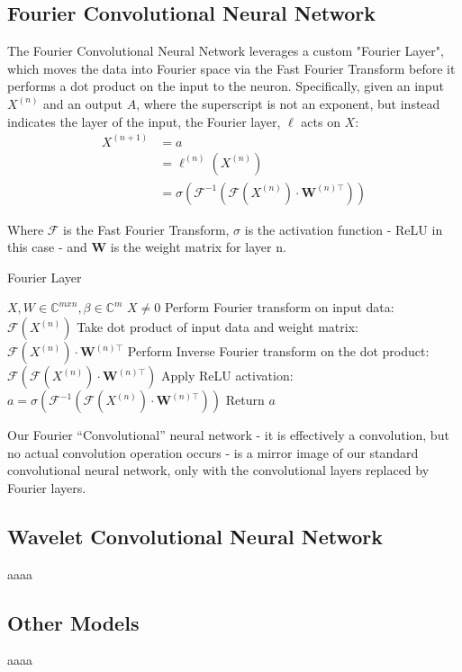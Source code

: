 \documentclass[10pt]{article}
\begin{document}
\subsection{Fourier Convolutional Neural Network}
The Fourier Convolutional Neural Network leverages a custom "Fourier Layer", which moves the data into Fourier space via the Fast Fourier Transform before it performs a dot product on the input to the neuron.
Specifically, given an input $X^{(n)}$ and an output $A$, where the superscript is not an exponent, but instead indicates the layer of the input, the Fourier layer, $\ell$ acts on $X$: 
\begin{align*}
X^{(n+1)} & = a \\
& = \ell^{(n)}(X^{(n)}) \\
& = \sigma(\mathcal{F}^{-1}(\mathcal{F}(X^{(n)})\cdot \mathbf{W}^{(n)\top}))
\end{align*}

Where $\mathcal{F}$ is the Fast Fourier Transform, $\sigma$ is the activation function - ReLU in this case - and $\mathbf{W}$ is the weight matrix for layer n.

\begin{algorithm}
\caption{Fourier Layer}
\label{Fourier layer}
\begin{algorithmic}[1]
\REQUIRE $X, W \in \mathbb{C}^{mxn}, \beta \in \mathbb{C}^m$
\ENSURE $X \neq 0$
\STATE Perform Fourier transform on input data: $\mathcal{F}(X^{(n)})$
\STATE Take dot product of input data and weight matrix: $\mathcal{F}(X^{(n)})\cdot \mathbf{W}^{(n)\top}$
\STATE Perform Inverse Fourier transform on the dot product: $\mathcal{F}(\mathcal{F}(X^{(n)})\cdot \mathbf{W}^{(n)\top})$
\STATE Apply ReLU activation: $a = \sigma(\mathcal{F}^{-1}(\mathcal{F}(X^{(n)})\cdot \mathbf{W}^{(n)\top}))$
\STATE Return $a$
\end{algorithmic}
\end{algorithm}

Our Fourier ``Convolutional'' neural network - it is effectively a convolution, but no actual convolution operation occurs - is a mirror image of our standard convolutional neural network, only with the convolutional layers replaced by Fourier layers. 

\subsection{Wavelet Convolutional Neural Network} \label{wavelet cnn}
aaaa

\subsection{Other Models} \label{other models}
aaaa
\end{document}
